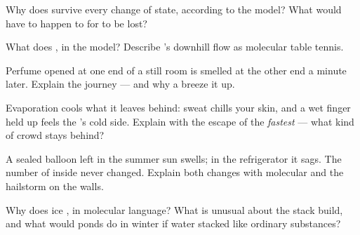 \begin{exercise}[$\star$]\label{exo:g7:states-of-matter:6}
Why does  survive every change of state, according to the
model? What would have to happen to  for  to be
lost?
\end{exercise}

\begin{exercise}[$\star$]\label{exo:g7:states-of-matter:7}
What does  , in the model? Describe 's
downhill flow as molecular table tennis.
\end{exercise}

\begin{exercise}[$\star$]\label{exo:g7:states-of-matter:8}
Perfume opened at one end of a still room is smelled at the other
end a minute later. Explain the journey --- and why a breeze
 it up.
\end{exercise}

\begin{exercise}[$\star\star$]\label{exo:g7:states-of-matter:9}
Evaporation cools what it leaves behind: sweat chills your skin,
and a wet finger held up feels the 's cold side. Explain with
the escape of the \emph{fastest}  --- what kind of crowd
stays behind?
\end{exercise}

\begin{exercise}[$\star\star$]\label{exo:g7:states-of-matter:10}
A sealed balloon left in the summer sun swells; in the
refrigerator it sags. The number of  inside never
changed. Explain both changes with molecular  and the
hailstorm on the walls.
\end{exercise}

\begin{exercise}[$\star\star$]\label{exo:g7:states-of-matter:11}
Why does ice , in molecular language? What is unusual about
the stack  build, and what would ponds do in
winter if water stacked like ordinary substances?
\end{exercise}

